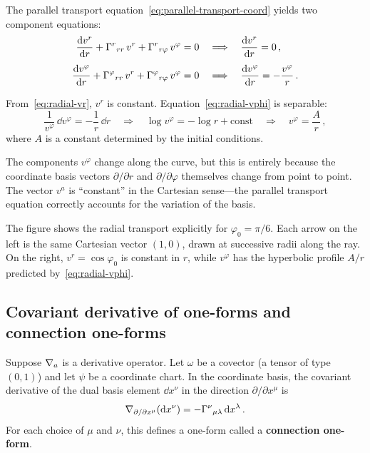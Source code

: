 The parallel transport
equation~\eqref{eq:parallel-transport-coord} yields two
component equations:
\begin{align}
  \frac{\mathrm{d} v^r}{\mathrm{d} r}
    + \Gamma^{r}{}_{rr}\, v^r
    + \Gamma^{r}{}_{r\varphi}\, v^\varphi
    &= 0
  \quad\Longrightarrow\quad
  \frac{\mathrm{d} v^r}{\mathrm{d} r} = 0\,,
  \label{eq:radial-vr}\\[4pt]
  \frac{\mathrm{d} v^\varphi}{\mathrm{d} r}
    + \Gamma^{\varphi}{}_{rr}\, v^r
    + \Gamma^{\varphi}{}_{r\varphi}\, v^\varphi
    &= 0
  \quad\Longrightarrow\quad
  \frac{\mathrm{d} v^\varphi}{\mathrm{d} r} = -\frac{v^\varphi}{r}\,.
  \label{eq:radial-vphi}
\end{align}

From~\eqref{eq:radial-vr}, $v^r$ is constant.
Equation~\eqref{eq:radial-vphi} is separable:
\[
  \frac{1}{v^\varphi}\,\dd v^\varphi = -\frac{1}{r}\,\dd r
  \quad\Longrightarrow\quad
  \log v^\varphi = -\log r + \text{const}
  \quad\Longrightarrow\quad
  v^\varphi = \frac{A}{r}\,,
\]
where $A$ is a constant determined by the initial conditions.

\begin{remark}
  The components $v^\varphi$ change along the curve, but this
  is entirely because the coordinate basis vectors
  $\partial/\partial r$ and $\partial/\partial\varphi$ themselves
  change from point to point.  The vector $v^a$ is ``constant''
  in the Cartesian sense---the parallel transport equation
  correctly accounts for the variation of the basis.
\end{remark}



\noindent
The figure shows the radial transport explicitly for $\varphi_0 =
\pi/6$.  Each arrow on the left is the same Cartesian vector
$(1,0)$, drawn at successive radii along the ray.  On the right,
$v^r = \cos\varphi_0$ is constant in $r$, while $v^\varphi$ has
the hyperbolic profile $A/r$ predicted
by~\eqref{eq:radial-vphi}.

\subsection{Covariant derivative of one-forms and connection
  one-forms}\label{sec:covd-oneforms}

Suppose $\nabla_a$ is a derivative operator.  Let $\omega$ be a
covector (a tensor of type~$(0,1)$) and let $\psi$ be a
coordinate chart.  In the coordinate basis, the covariant
derivative of the dual basis element $\dd x^\nu$ in the
direction $\partial/\partial x^\mu$ is
\begin{equation}\label{eq:covd-dual-basis}
  \nabla_{\partial/\partial x^\mu}(\mathrm{d} x^\nu)
    = -\Gamma^{\nu}{}_{\mu\lambda}\,\mathrm{d} x^\lambda\,.
\end{equation}
For each choice of $\mu$ and $\nu$, this defines a one-form
called a \textbf{connection one-form}.

